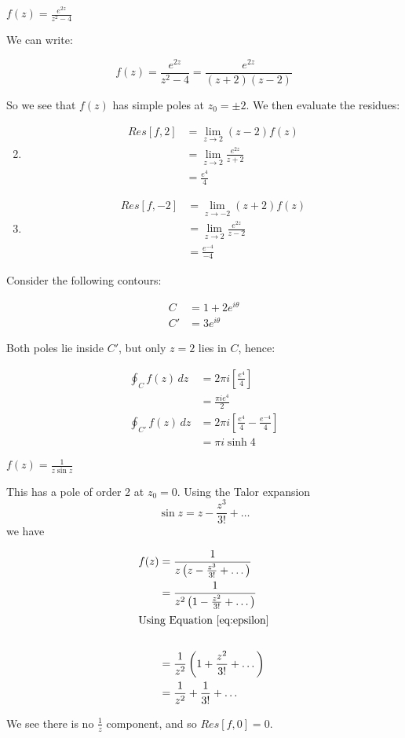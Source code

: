 \documentclass{../../physics_notes}
\begin{document}
\begin{example}{$f(z) = \frac{e^{2z}}{z^2 - 4}$}

We can write:

\[ f(z) = \frac{e^{2z}}{z^2 - 4} = \frac{e^{2z}}{(z+2)(z-2)} \]

So we see that $f(z)$ has simple poles at $z_0=\pm 2$. We then evaluate the residues:

\begin{enumerate}[label={$z_0=\arabic*$:}]
	\setcounter{enumi}{1}
	\item{
		\begin{align*}
			Res[f,2] &= \lim_{z\to 2} (z-2) f(z) \\
			&= \lim_{z\to 2} \frac{e^{2z}}{z+2} \\
			&= \frac{e^4}{4}
		\end{align*}
	}
	\setcounter{enumi}{-3}
	\item{
		\begin{align*}
			Res[f,-2] &= \lim_{z\to -2} (z+2) f(z) \\
			&= \lim_{z\to 2} \frac{e^{2z}}{z-2} \\
			&= \frac{e^{-4}}{-4}
		\end{align*}
	}
\end{enumerate}

Consider the following contours:

\begin{align*}
	C &= 1 + 2e^{i\theta} \\
	C' &= 3e^{i\theta} 
\end{align*}

Both poles lie inside $C'$, but only $z=2$ lies in $C$, hence:

\begin{align*}
	\oint_C f(z)\, dz &= 2\pi i \left[\frac{e^4}{4}\right] \\
	&= \frac{\pi i e^4}{2} \\
	\oint_{C'} f(z)\, dz &= 2\pi i \left[\frac{e^4}{4} - \frac{e^{-4}}{4}\right] \\
	&= \pi i \sinh{4}
\end{align*}
\end{example}

\begin{example}{$f(z) = \frac{1}{z\sin z}$}

This has a pole of order 2 at $z_0 = 0$. Using the Talor expansion \[ \sin z = z - \frac{z^3}{3!} + \dots \] we have 

\begin{align*} 
f(z) &= \frac{1}{z\left(z - \frac{z^3}{3!} + \dots \right)} \\
&= \frac{1}{z^2 \left(1 - \frac{z^2}{3!} + \dots \right)} \\
\intertext{Using Equation \ref{eq:epsilon}} \\
&= \frac{1}{z^2}\left(1 + \frac{z^2}{3!} + \dots \right) \\
&= \frac{1}{z^2} + \frac{1}{3!} + \dots
\end{align*}

We see there is no $\frac{1}{z}$ component, and so $Res[f,0] = 0$.

\end{example}
\end{document}
